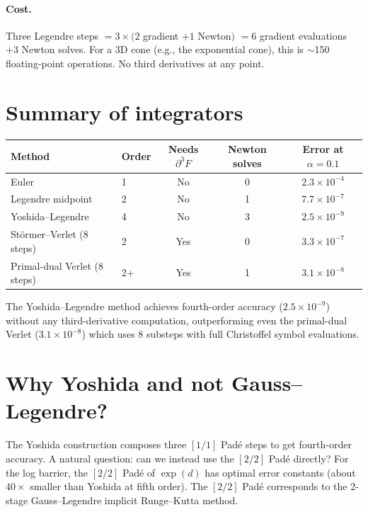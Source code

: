 \documentclass[11pt]{article}
\begin{document}
\paragraph{Cost.}
Three Legendre steps $= 3 \times (2$ gradient $+ 1$ Newton$)$
$= 6$ gradient evaluations $+ 3$ Newton solves.  For a 3D cone
(e.g., the exponential cone), this is $\sim$150 floating-point
operations.  No third derivatives at any point.

\section{Summary of integrators}

\begin{center}
\renewcommand{\arraystretch}{1.2}
\begin{tabular}{@{}llccc@{}}
\toprule
\textbf{Method} & \textbf{Order} & \textbf{Needs $\partial^3 F$} &
  \textbf{Newton solves} & \textbf{Error at $\alpha\!=\!0.1$} \\
\midrule
Euler & 1 & No & 0 & $2.3 \times 10^{-4}$ \\
Legendre midpoint & 2 & No & 1 & $7.7 \times 10^{-7}$ \\
Yoshida--Legendre & 4 & No & 3 & $2.5 \times 10^{-9}$ \\
\midrule
St\"ormer--Verlet (8 steps) & 2 & Yes & 0 & $3.3 \times 10^{-7}$ \\
Primal-dual Verlet (8 steps) & 2+ & Yes & 1 & $3.1 \times 10^{-8}$ \\
\bottomrule
\end{tabular}
\end{center}

The Yoshida--Legendre method achieves fourth-order accuracy
($2.5 \times 10^{-9}$) without any third-derivative computation,
outperforming even the primal-dual Verlet ($3.1 \times 10^{-8}$)
which uses 8 substeps with full Christoffel symbol evaluations.

\section{Why Yoshida and not Gauss--Legendre?}

The Yoshida construction composes three $[1/1]$ Pad\'e steps to get
fourth-order accuracy.  A natural question: can we instead use the
$[2/2]$ Pad\'e directly?  For the log barrier, the $[2/2]$ Pad\'e of
$\exp(d)$ has optimal error constants (about $40\times$ smaller than
Yoshida at fifth order).  The $[2/2]$ Pad\'e corresponds to the
2-stage Gauss--Legendre implicit Runge--Kutta method.
\end{document}

